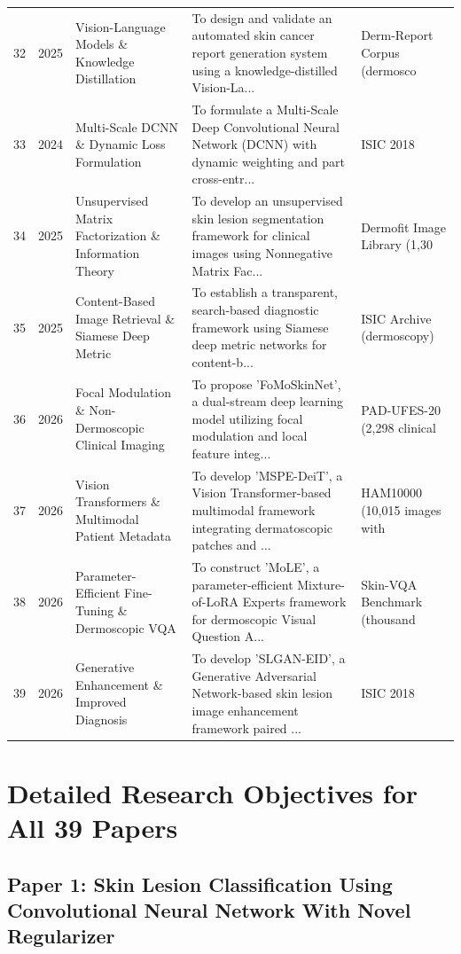 \documentclass[10pt,a4paper]{article}
\begin{document}
\begin{longtable}{p{0.6cm} p{1.2cm} p{3.2cm} p{7.0cm} p{2.8cm}}
32 & 2025 & Vision-Language Models \& Knowledge Distillation & To design and validate an automated skin cancer report generation system using a knowledge-distilled Vision-La... & Derm-Report Corpus (dermosco \\
33 & 2024 & Multi-Scale DCNN \& Dynamic Loss Formulation & To formulate a Multi-Scale Deep Convolutional Neural Network (DCNN) with dynamic weighting and part cross-entr... & ISIC 2018 \\
34 & 2025 & Unsupervised Matrix Factorization \& Information Theory & To develop an unsupervised skin lesion segmentation framework for clinical images using Nonnegative Matrix Fac... & Dermofit Image Library (1,30 \\
35 & 2025 & Content-Based Image Retrieval \& Siamese Deep Metric & To establish a transparent, search-based diagnostic framework using Siamese deep metric networks for content-b... & ISIC Archive (dermoscopy) \\
36 & 2026 & Focal Modulation \& Non-Dermoscopic Clinical Imaging & To propose 'FoMoSkinNet', a dual-stream deep learning model utilizing focal modulation and local feature integ... & PAD-UFES-20 (2,298 clinical  \\
37 & 2026 & Vision Transformers \& Multimodal Patient Metadata & To develop 'MSPE-DeiT', a Vision Transformer-based multimodal framework integrating dermatoscopic patches and ... & HAM10000 (10,015 images with \\
38 & 2026 & Parameter-Efficient Fine-Tuning \& Dermoscopic VQA & To construct 'MoLE', a parameter-efficient Mixture-of-LoRA Experts framework for dermoscopic Visual Question A... & Skin-VQA Benchmark (thousand \\
39 & 2026 & Generative Enhancement \& Improved Diagnosis & To develop 'SLGAN-EID', a Generative Adversarial Network-based skin lesion image enhancement framework paired ... & ISIC 2018 \\
\bottomrule
\end{longtable}

\newpage
\section{Detailed Research Objectives for All 39 Papers}
\subsection*{Paper 1: Skin Lesion Classification Using Convolutional Neural Network With Novel Regularizer}
\end{document}
